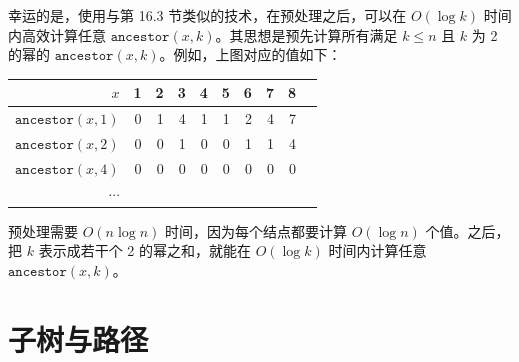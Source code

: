 幸运的是，使用与第 16.3 节类似的技术，在预处理之后，可以在 $O(\log k)$ 时间内高效计算任意 $\texttt{ancestor}(x,k)$。其思想是预先计算所有满足 $k \le n$ 且 $k$ 为 2 的幂的 $\texttt{ancestor}(x,k)$。例如，上图对应的值如下：

\begin{center}
\begin{tabular}{r|rrrrrrrrr}
$x$ & 1 & 2 & 3 & 4 & 5 & 6 & 7 & 8 \\
\hline
$\texttt{ancestor}(x,1)$ & 0 & 1 & 4 & 1 & 1 & 2 & 4 & 7 \\
$\texttt{ancestor}(x,2)$ & 0 & 0 & 1 & 0 & 0 & 1 & 1 & 4 \\
$\texttt{ancestor}(x,4)$ & 0 & 0 & 0 & 0 & 0 & 0 & 0 & 0 \\
$\cdots$ \\
\end{tabular}
\end{center}

预处理需要 $O(n \log n)$ 时间，因为每个结点都要计算 $O(\log n)$ 个值。之后，把 $k$ 表示成若干个 2 的幂之和，就能在 $O(\log k)$ 时间内计算任意 $\texttt{ancestor}(x,k)$。

\section{子树与路径}


